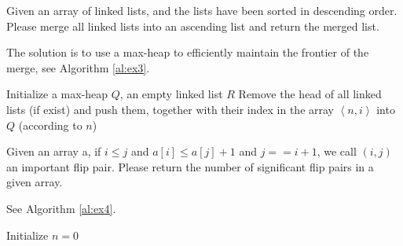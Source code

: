 \begin{exercise}[]{Given an array of linked lists, and the lists have been sorted in descending order. Please merge all linked lists into an ascending list and return the merged list.}
  \begin{solution} The solution is to use a max-heap to efficiently maintain the frontier of the merge, see Algorithm \ref{al:ex3}.
    \begin{algorithm}[H]
      \BlankLine
      Initialize a max-heap $Q$, an empty linked list $R$\;
      Remove the head of all linked lists (if exist) and push them, together with their index in the array $\left\langle n, i \right\rangle$ into $Q$ (according to $n$) \;
      \caption{Merge k sorted linked lists \label{al:ex3}}
    \end{algorithm}
  \end{solution}
  \label{ex3}
\end{exercise}

\begin{exercise}[]{Given an array a, if $i \leq j$ and $a[i] \leq a[j] + 1$ and $j == i+1$, we call $(i, j)$ an important flip pair. Please return the number of significant flip pairs in a given array.}
  \begin{solution}
    See Algorithm \ref{al:ex4}.

    \begin{algorithm}[H]
      \BlankLine
      Initialize $n=0$ \;
      \caption{Find important flip pair \label{al:ex4}}
    \end{algorithm}
  \end{solution}
  \label{ex4}
\end{exercise}

